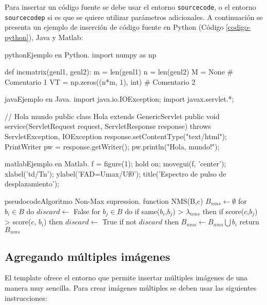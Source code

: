 		Para insertar un código fuente se debe usar el entorno \texttt{sourcecode}, o el entorno \texttt{sourcecodep} si es que se quiere utilizar parámetros adicionales. A continuación se presenta un ejemplo de inserción de código fuente en Python (Código \ref{codigo-python}), Java y Matlab:

\begin{sourcecode}[\label{codigo-python}]{python}{Ejemplo en Python.}
import numpy as np

def incmatrix(genl1, genl2):
	m = len(genl1)
	n = len(genl2)
	M = None # Comentario 1
	VT = np.zeros((n*m, 1), int) # Comentario 2
\end{sourcecode}

\begin{sourcecode}[]{java}{Ejemplo en Java.}
import java.io.IOException;
import javax.servlet.*;

// Hola mundo
public class Hola extends GenericServlet {
	public void service(ServletRequest request, ServletResponse response)
	throws ServletException, IOException{
		response.setContentType("text/html");
		PrintWriter pw = response.getWriter();
		pw.println("Hola, mundo!");
	}
}
\end{sourcecode}

\begin{sourcecode}{matlab}{Ejemplo en Matlab.}
f = figure(1); hold on; movegui(f, 'center');
xlabel('td/Tn'); ylabel('FAD=Umax/Uf0');
title('Espectro de pulso de desplazamiento');
\end{sourcecode}

\begin{sourcecode}{pseudocode}{Algoritmo Non-Max supression.}
function NMS(B,c)
	$B_{nms} \leftarrow \emptyset$
	for $b_i \in B$ do
		$discard \leftarrow$ False
		for $b_j \in B$ do
			if same($b_i$,$b_j$) > $\lambda_{nms}$ then
				if score($c$,$b_j$) > score($c$, $b_i$) then
					$discard \leftarrow$ True
		if not $discard$ then
			$B_{nms} \leftarrow B_{nms} \bigcup b_i$
	return $B_{nms}$
\end{sourcecode}

	\subsection{Agregando múltiples imágenes}

	El template ofrece el entorno \href{https://latex.ppizarror.com/informe.html#hlp-images}{} que permite insertar múltiples imágenes de una manera muy sencilla. Para crear imágenes múltiples se deben usar las siguientes instrucciones:

